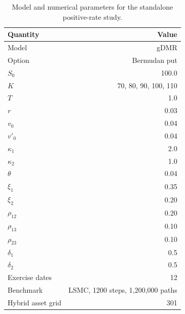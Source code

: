 \begin{table}[htbp]
\centering
\caption{Model and numerical parameters for the standalone positive-rate study.}
\label{tab:bgk_r03_v004_t1_delta05_nex12-experimental-setting}
\begin{tabular}{lr}
\toprule
Quantity & Value \\
\midrule
Model & gDMR \\
Option & Bermudan put \\
$S_0$ & 100.0 \\
$K$ & 70, 80, 90, 100, 110 \\
$T$ & 1.0 \\
$r$ & 0.03 \\
$v_0$ & 0.04 \\
$v'_0$ & 0.04 \\
$\kappa_1$ & 2.0 \\
$\kappa_2$ & 1.0 \\
$\theta$ & 0.04 \\
$\xi_1$ & 0.35 \\
$\xi_2$ & 0.20 \\
$\rho_{12}$ & 0.20 \\
$\rho_{13}$ & 0.10 \\
$\rho_{23}$ & 0.10 \\
$\delta_1$ & 0.5 \\
$\delta_2$ & 0.5 \\
Exercise dates & 12 \\
Benchmark & LSMC, 1200 steps, 1,200,000 paths \\
Hybrid asset grid & 301 \\
\bottomrule
\end{tabular}
\end{table}
